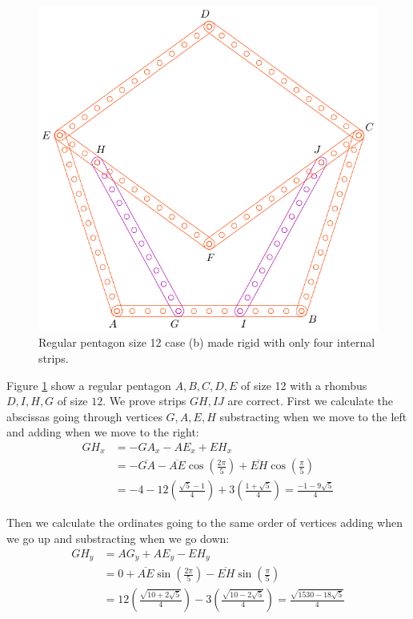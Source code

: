 \documentclass[11pt]{article}
\begin{document}
\begin{figure}[h]
 \centering
 \includegraphics[scale=0.8]{12/penta12b}
 \caption{Regular pentagon size 12 case (b) made rigid with only four internal strips.}
 \label{fig:penta12b}
\end{figure}

Figure \ref{fig:penta12b} show a regular pentagon $A,B,C,D,E$ of size 12 with a rhombus $D,I,H,G$ of size $12$. We prove strips $GH,IJ$ are correct. First we calculate the abscissas going through vertices $G,A,E,H$ substracting when we move to the left and adding when we move to the right:
\begin{align}
GH_x &= -GA_x - AE_x + EH_x\nonumber\\
 &= -\overline{GA} - \overline{AE}\cos\left(\frac{2\pi}5\right)
 +\overline{EH}\cos\left(\frac{\pi}5\right)\nonumber\\
 &= -4 - 12\left(\frac{\sqrt5 - 1}4\right) + 3\left(\frac{1+\sqrt5}4\right)
 = \frac{-1-9\sqrt5}4
\end{align}

Then we calculate the ordinates going to the same order of vertices adding when we go up and substracting when we go down:
\begin{align}
GH_y &= AG_y + AE_y - EH_y\nonumber\\
 &= 0 + \overline{AE}\sin\left(\frac{2\pi}5\right)
 - \overline{EH}\sin\left(\frac{\pi}5\right)\nonumber\\
 &= 12\left(\frac{\sqrt{10+2\sqrt5}}4\right)
 - 3\left(\frac{\sqrt{10-2\sqrt5}}4\right)%
 = \frac{\sqrt{1530-18\sqrt5}}4
\end{align}
\end{document}

